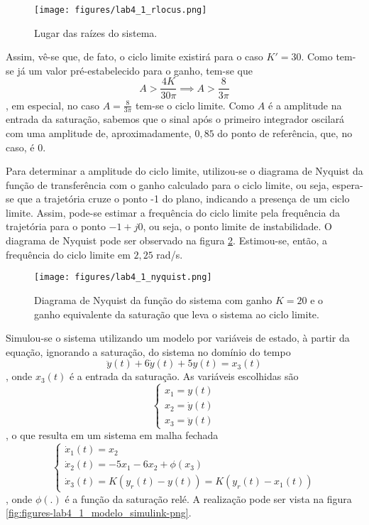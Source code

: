 \documentclass[a4paper]{report}
\begin{document}
\begin{figure}[H]
    \centering
    \texttt{[image: figures/lab4\_1\_rlocus.png]}
    \caption{Lugar das raízes do sistema.}
    \label{fig:figures-lab4_1_rlocus-png}
\end{figure}

Assim, vê-se que, de fato, o ciclo limite existirá para o caso $K' = 30$. Como tem-se já um valor pré-estabelecido para o ganho, tem-se que \[
    A > \frac{4K}{30\pi} \implies A > \frac{8}{3\pi}
\], em especial, no caso $A=\frac{8}{3\pi}$ tem-se o ciclo limite. Como $A$ é a amplitude na entrada da saturação, sabemos que o sinal após o primeiro integrador oscilará com uma amplitude de, aproximadamente, $0,85$ do ponto de referência, que, no caso, é $0$.

Para determinar a amplitude do ciclo limite, utilizou-se o diagrama de Nyquist da função de transferência com o ganho calculado para o ciclo limite, ou seja, espera-se que a trajetória cruze o ponto -1 do plano, indicando a presença de um ciclo limite. Assim, pode-se estimar a frequência do ciclo limite pela frequência da trajetória para o ponto $-1 + j0$, ou seja, o ponto limite de instabilidade. O diagrama de Nyquist pode ser observado na figura \ref{fig:figures-lab4_1_nyquist-png}. Estimou-se, então, a frequência do ciclo limite em $2,25$ rad/s.

\begin{figure}[H]
    \centering
    \texttt{[image: figures/lab4\_1\_nyquist.png]}
    \caption{Diagrama de Nyquist da função do sistema com ganho $K=20$ e o ganho equivalente da saturação que leva o sistema ao ciclo limite.}
    \label{fig:figures-lab4_1_nyquist-png}
\end{figure}

Simulou-se o sistema utilizando um modelo por variáveis de estado, à partir da equação, ignorando a saturação, do sistema no domínio do tempo \[
\ddot{y}(t) + 6\dot{y}(t) + 5y(t) = x_3(t)
\], onde $x_3(t)$ é a entrada da saturação. As variáveis escolhidas são \[
\begin{cases}
    x_1 = y(t) \\
    x_2 = \dot{y}(t) \\
    x_3 = \ddot{y}(t)
\end{cases}
\], o que resulta em um sistema em malha fechada \[
\begin{cases}
    \dot{x}_1(t) = x_2 \\
    \dot{x}_2(t) = -5x_1 -6x_2 + \phi(x_3) \\
    \dot{x}_3(t) = K(y_r(t) - y(t)) = K(y_r(t) - x_1(t))
\end{cases}
\], onde $\phi(.)$ é a função da saturação relé. A realização pode ser vista na figura \ref{fig:figures-lab4_1_modelo_simulink-png}.
\end{document}

